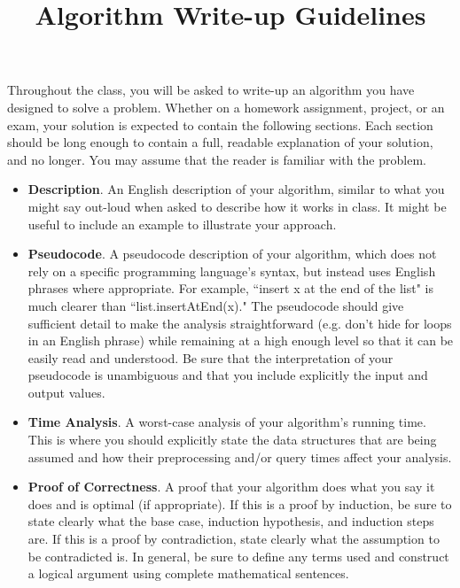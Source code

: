 \documentclass[12pt]{article}
\title{Algorithm Write-up Guidelines}
\author{}
\date{} %
\begin{document}
\maketitle

Throughout the class, you will be asked to write-up an algorithm you have designed to solve a problem. Whether on a homework assignment, project, or an exam, your solution is expected to contain the following sections. Each section should be long enough to contain a full, readable explanation of your solution, and no longer. You may assume that the reader is familiar with the problem.

\begin{itemize}
\item \textbf{Description}. An English description of your algorithm, similar to what you might say out-loud when
asked to describe how it works in class. It might be useful to include an example to illustrate your
approach.
\item \textbf{Pseudocode}. A pseudocode description of your algorithm, which does not rely on a specific programming language's syntax, but instead uses English phrases where appropriate. For example, ``insert x
at the end of the list" is much clearer than ``list.insertAtEnd(x)." The pseudocode should give sufficient detail to make the analysis straightforward (e.g. don't hide for loops in an English phrase) while remaining at a high enough level so that it can be easily read and understood. Be sure that the interpretation of your pseudocode is unambiguous and that you include explicitly the input and output values.
\item \textbf{Time Analysis}. A worst-case analysis of your algorithm's running time. This is where you should explicitly state the data structures that are being assumed and how their preprocessing and/or query times affect your analysis.
\item \textbf{Proof of Correctness}. A proof that your algorithm does what you say it does and is optimal (if appropriate). If this is a proof by induction, be sure to state clearly what the base case, induction hypothesis, and induction steps are. If this is a proof by contradiction, state clearly what the assumption to be contradicted is. In general, be sure to define any terms used and construct a logical argument using complete mathematical sentences.
\end{itemize}
\end{document}
